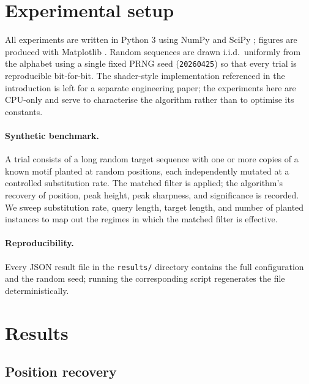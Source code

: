 \documentclass[twocolumn,11pt,a4paper]{article}
\theoremstyle{definition}
\theoremstyle{remark}
\begin{document}
\section{Experimental setup}
\label{sec:setup}

All experiments are written in Python 3 using NumPy
\citep{harris2020numpy} and SciPy \citep{virtanen2020scipy}; figures
are produced with Matplotlib \citep{hunter2007matplotlib}. Random
sequences are drawn i.i.d.\ uniformly from the alphabet using a single
fixed PRNG seed (\verb|20260425|) so that every trial is reproducible
bit-for-bit. The shader-style implementation referenced in the
introduction is left for a separate engineering paper; the experiments
here are CPU-only and serve to characterise the algorithm rather than
to optimise its constants.

\paragraph{Synthetic benchmark.} A trial consists of a long random
target sequence with one or more copies of a known motif planted at
random positions, each independently mutated at a controlled
substitution rate. The matched filter is applied; the algorithm's
recovery of position, peak height, peak sharpness, and significance is
recorded. We sweep substitution rate, query length, target length, and
number of planted instances to map out the regimes in which the matched
filter is effective.

\paragraph{Reproducibility.} Every JSON result file in the
\verb|results/| directory contains the full configuration and the
random seed; running the corresponding script regenerates the file
deterministically.

\section{Results}
\label{sec:exp}

\subsection{Position recovery}
\label{sec:exp:pos}
\end{document}
